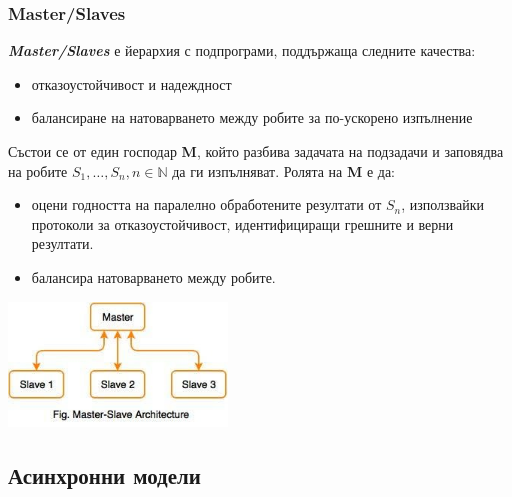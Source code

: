 \documentclass[fleqn,12pt]{article}
\begin{document}
\subsubsection{Master/Slaves}

\textbf{\textit{Master/Slaves}} е йерархия с подпрограми, поддържаща следните качества:
\begin{itemize}
    \item отказоустойчивост и надеждност
    \item балансиране на натоварването между робите за по-ускорено изпълнение
\end{itemize}

Състои се от един господар \textbf{M}, който разбива задачата на подзадачи и заповядва на робите $S_1, \dots, S_n, n \in \mathbb{N}$ да ги изпълняват.
Ролята на \textbf{M} е да:
\begin{itemize}
    \item оцени годността на паралелно обработените резултати от $S_n$, използвайки протоколи за отказоустойчивост, идентифициращи грешните и верни резултати.
    \item балансира натоварването между робите.
\end{itemize}

\begin{center} \includegraphics[width=220px]{master_slave.jpg} \end{center}

\subsection{Асинхронни модели}
\end{document}
